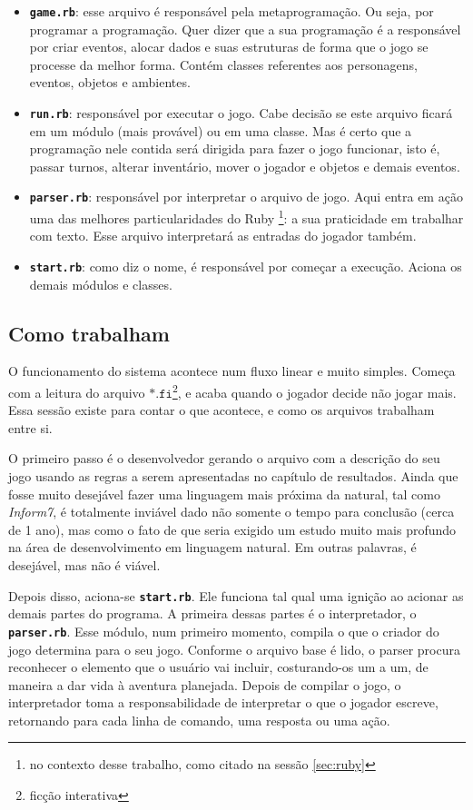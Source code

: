\begin{itemize}
  \item \texttt{\textbf{game.rb}}: esse arquivo é responsável pela
  metaprogramação. Ou seja, por programar a programação. Quer dizer que a sua
  programação é a responsável por criar eventos, alocar dados e suas estruturas
  de forma que o jogo se processe da melhor forma. Contém classes referentes aos
  personagens, eventos, objetos e ambientes.
  \item \texttt{\textbf{run.rb}}: responsável por executar o jogo. Cabe decisão
  se este arquivo ficará em um módulo (mais provável) ou em uma classe. Mas é
  certo que a programação nele contida será dirigida para fazer o jogo funcionar,
  isto é, passar turnos, alterar inventário, mover o jogador e objetos e demais
  eventos.
  \item \texttt{\textbf{parser.rb}}: responsável por interpretar o arquivo de
  jogo. Aqui entra em ação uma das melhores particularidades do Ruby
  \footnote{no contexto desse trabalho, como citado na sessão \ref{sec:ruby}}: a
  sua praticidade em trabalhar com texto. Esse arquivo interpretará as entradas
  do jogador também.
  \item \texttt{\textbf{start.rb}}: como diz o nome, é responsável por começar a
  execução. Aciona os demais módulos e classes.
\end{itemize}

\subsection{Como trabalham}
\label{subsec:how-they-work}

O funcionamento do sistema acontece num fluxo linear e muito simples. Começa com
a leitura do arquivo $\mathtt{*.fi}$\footnote{ficção interativa}, e acaba quando
o jogador decide não jogar mais. Essa sessão existe para contar o que acontece,
e como os arquivos trabalham entre si.

O primeiro passo é o desenvolvedor gerando o arquivo com a descrição do seu jogo
usando as regras a serem apresentadas no capítulo de resultados. Ainda que fosse
muito desejável fazer uma linguagem mais próxima da natural, tal como
\emph{Inform7}, é totalmente inviável dado não somente o tempo para conclusão
(cerca de 1 ano), mas como o fato de que seria exigido um estudo muito mais
profundo na área de desenvolvimento em linguagem natural. Em outras palavras, é
desejável, mas não é viável.

Depois disso, aciona-se \texttt{\textbf{start.rb}}. Ele funciona tal qual uma
ignição ao acionar as demais partes do programa. A primeira dessas partes é o
interpretador, o \texttt{\textbf{parser.rb}}. Esse módulo, num primeiro momento,
compila o que o criador do jogo determina para o seu jogo. Conforme o arquivo
base é lido, o parser procura reconhecer o elemento que o usuário vai incluir,
costurando-os um a um, de maneira a dar vida à aventura planejada. Depois de
compilar o jogo, o interpretador toma a responsabilidade de interpretar o que o
jogador escreve, retornando para cada linha de comando, uma resposta ou uma ação.

